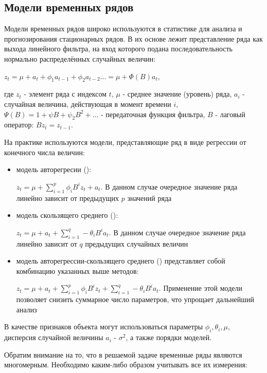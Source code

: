 \subsection{Модели временных рядов}

Модели временных рядов широко используются в статистике для анализа и прогнозирования стационарных рядов. В их основе лежит представление ряда как выхода линейного фильтра, на вход которого подана последовательность нормально распределённых случайных величин:

$z_t=\mu+a_t+\phi_1a_{t-1}+\phi_2a_{t-2}...=\mu+\Phi(B)a_t$, 

где $z_t$ - элемент ряда с индексом $t$, $\mu$ - среднее значение (уровень) ряда, $a_i$ - случайная величина, действующая в момент времени $i$, $\Psi(B)=1+\psi B+\psi_2 B^2+...$ - передаточная функция фильтра, $B$ - лаговый оператор: $Bz_t=z_{t-1}$.

На практике используются модели, представляющие ряд в виде регрессии от конечного числа величин\cite{bj_ts}: 

\begin{itemize}
\item модель авторегресии (): 

$z_t=\mu+\sum\limits_{i=1}^p \phi_iB^i z_t + a_t$. В данном случае очередное значение ряда линейно зависит от предыдущих $p$ значений ряда
\item модель скользящего среднего ():

$z_t=\mu + a_t + \sum\limits_{i=1}^q -\theta_iB^i a_t $. В данном случае очередное значение ряда линейно зависит от $q$ предыдущих случайных величин
\item модель авторегрессии-скользящего среднего () представляет собой комбинацию указанных выше методов:

$z_t=\mu + a_t + \sum\limits_{i=1}^p \phi_iB^i z_t + \sum\limits_{i=1}^q -\theta_iB^i a_t $. Применение этой модели позволяет снизить суммарное число параметров, что упрощает дальнейший анализ
\end{itemize}

В качестве признаков объекта могут использоваться параметры $\phi_i, \theta_i, \mu$, дисперсия случайной величины $a_i$ - $\sigma^2$, а также порядки моделей.

Обратим внимание на то, что в решаемой задаче временные ряды являются многомерным. Необходимо каким-либо образом учитывать все их измерения:

